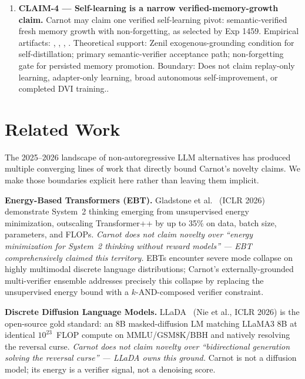 \documentclass[10pt]{article}
\begin{document}
\begin{enumerate}
  \item \textbf{CLAIM-4 --- Self-learning is a narrow verified-memory-growth claim.} Carnot may claim one verified self-learning pivot: semantic-verified fresh memory growth with non-forgetting, as selected by Exp 1459.
  Empirical artifacts: , , , .
  Theoretical support: Zenil exogenous-grounding condition for self-distillation; primary semantic-verifier acceptance path; non-forgetting gate for persisted memory promotion.
  Boundary: Does not claim replay-only learning, adapter-only learning, broad autonomous self-improvement, or completed DVI training..
\end{enumerate}

\section{Related Work}
\label{sec:related}

The 2025--2026 landscape of non-autoregressive LLM alternatives has
produced multiple converging lines of work that directly bound
Carnot's novelty claims. We make those boundaries explicit here
rather than leaving them implicit.

\textbf{Energy-Based Transformers (EBT).} Gladstone et
al.~\cite{gladstone2025ebt} (ICLR 2026) demonstrate System~2
thinking emerging from unsupervised energy minimization, outscaling
Transformer++ by up to 35\% on data, batch size, parameters, and
FLOPs. \emph{Carnot does not claim novelty over ``energy minimization
for System~2 thinking without reward models'' --- EBT comprehensively
claimed this territory.} EBTs encounter severe mode collapse on
highly multimodal discrete language distributions; Carnot's
externally-grounded multi-verifier ensemble addresses precisely
this collapse by replacing the unsupervised energy bound with a
$k$-AND-composed verifier constraint.

\textbf{Discrete Diffusion Language Models.} LLaDA~\cite{nie2025llada}
(Nie et al., ICLR 2026) is the open-source gold standard: an 8B
masked-diffusion LM matching LLaMA3 8B at identical $10^{23}$~FLOP
compute on MMLU/GSM8K/BBH and natively resolving the reversal
curse. \emph{Carnot does not claim novelty over ``bidirectional
generation solving the reversal curse'' --- LLaDA owns this ground.}
Carnot is not a diffusion model; its energy is a verifier signal, not
a denoising score.
\end{document}
